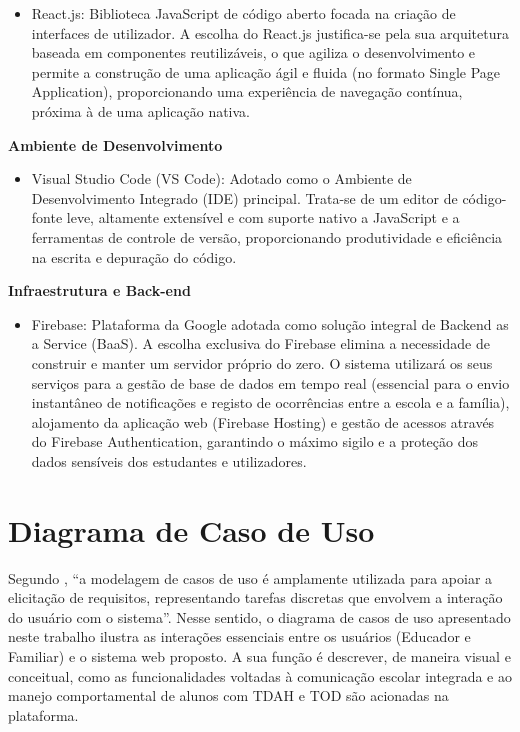 \begin{itemize}
    \item React.js: Biblioteca JavaScript de código aberto focada na criação de interfaces de utilizador. A escolha do React.js justifica-se pela sua arquitetura baseada em componentes reutilizáveis, o que agiliza o desenvolvimento e permite a construção de uma aplicação ágil e fluida (no formato Single Page Application), proporcionando uma experiência de navegação contínua, próxima à de uma aplicação nativa.
\end{itemize}

\noindent\textbf {Ambiente de Desenvolvimento}

\begin{itemize}
    \item Visual Studio Code (VS Code): Adotado como o Ambiente de Desenvolvimento Integrado (IDE) principal. Trata-se de um editor de código-fonte leve, altamente extensível e com suporte nativo a JavaScript e a ferramentas de controle de versão, proporcionando produtividade e eficiência na escrita e depuração do código.
\end{itemize}

\vspace{0.3cm}
\noindent\textbf {Infraestrutura e Back-end}

\begin{itemize}
    \item Firebase: Plataforma da Google adotada como solução integral de Backend as a Service (BaaS). A escolha exclusiva do Firebase elimina a necessidade de construir e manter um servidor próprio do zero. O sistema utilizará os seus serviços para a gestão de base de dados em tempo real (essencial para o envio instantâneo de notificações e registo de ocorrências entre a escola e a família), alojamento da aplicação web (Firebase Hosting) e gestão de acessos através do Firebase Authentication, garantindo o máximo sigilo e a proteção dos dados sensíveis dos estudantes e utilizadores.
\end{itemize}

\vspace{0.5cm}
\section{Diagrama de Caso de Uso}

Segundo , “a modelagem de casos de uso é amplamente utilizada para apoiar a elicitação de requisitos, representando tarefas discretas que envolvem a interação do usuário com o sistema”. Nesse sentido, o diagrama de casos de uso apresentado neste trabalho ilustra as interações essenciais entre os usuários (Educador e Familiar) e o sistema web proposto. A sua função é descrever, de maneira visual e conceitual, como as funcionalidades voltadas à comunicação escolar integrada e ao manejo comportamental de alunos com TDAH e TOD são acionadas na plataforma.

